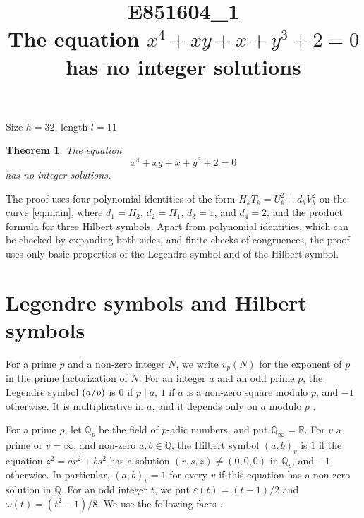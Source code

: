 \documentclass[11pt]{article}
\title{\textbf{E851604\_1}\\[4pt] {\Large The equation $x^{4}+xy+x+y^{3}+2=0$ has no integer solutions}}
\author{}
\date{}
\newtheorem{theorem}{Theorem}
\newcommand{\Q}{\mathbb{Q}}
\newcommand{\leg}[2]{\mathchoice{\biggl(\dfrac{#1}{#2}\biggr)}{(#1/#2)}{(#1/#2)}{(#1/#2)}}
\begin{document}
\maketitle
\vspace{-8ex}
\begin{center}
Size $h=32$, length $l=11$
\end{center}

\begin{theorem}\label{thm:main}
The equation
\begin{equation}\label{eq:main}
x^{4}+xy+x+y^{3}+2=0
\end{equation}
has no integer solutions.
\end{theorem}

The proof uses four polynomial identities of the form $H_kT_k=U_k^2+d_kV_k^2$ on the curve \eqref{eq:main}, where $d_{1}=H_{2}$, $d_{2}=H_{1}$, $d_{3}=1$, and $d_{4}=2$, and the product formula for three Hilbert symbols. Apart from polynomial identities, which can be checked by expanding both sides, and finite checks of congruences, the proof uses only basic properties of the Legendre symbol and of the Hilbert symbol.

\section{Legendre symbols and Hilbert symbols}

For a prime $p$ and a non-zero integer $N$, we write $v_p(N)$ for the exponent of $p$ in the prime factorization of $N$. For an integer $a$ and an odd prime $p$, the Legendre symbol $\leg{a}{p}$ is $0$ if $p\mid a$, $1$ if $a$ is a non-zero square modulo $p$, and $-1$ otherwise. It is multiplicative in $a$, and it depends only on $a$ modulo $p$ \cite[Chapter~5]{IR}.

For a prime $p$, let $\Q_p$ be the field of $p$-adic numbers, and put $\Q_\infty=\mathbb R$. For $v$ a prime or $v=\infty$, and non-zero $a,b\in\Q$, the Hilbert symbol $(a,b)_v$ is $1$ if the equation $z^2=ar^2+bs^2$ has a solution $(r,s,z)\neq(0,0,0)$ in $\Q_v$, and $-1$ otherwise. In particular, $(a,b)_v=1$ for every $v$ if this equation has a non-zero solution in $\Q$. For an odd integer $t$, we put $\varepsilon(t)=(t-1)/2$ and $\omega(t)=(t^2-1)/8$. We use the following facts \cite[Chapter~III, Proposition~2 and Theorems~1 and~3]{Se}.
\end{document}
